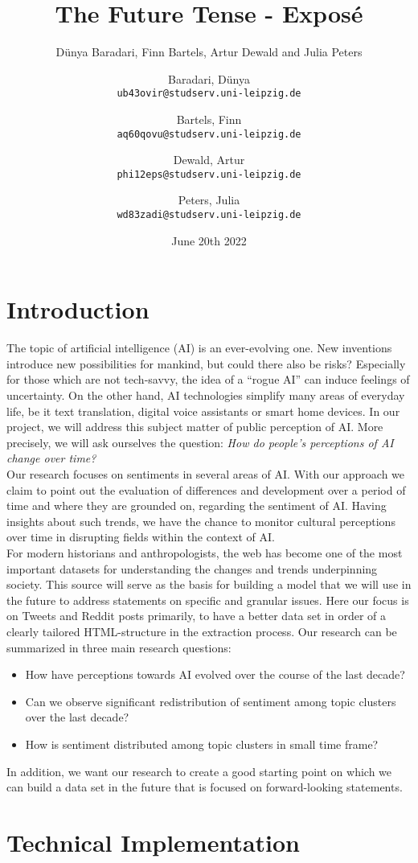 \documentclass[11pt]{article}
\author{
  Dünya Baradari, Finn Bartels, Artur Dewald and Julia Peters
}
\author{
      Baradari, Dünya\\
      \texttt{ub43ovir@studserv.uni-leipzig.de}
      \and
      Bartels, Finn\\
      \texttt{aq60qovu@studserv.uni-leipzig.de}
      \and
      Dewald, Artur\\
      \texttt{phi12eps@studserv.uni-leipzig.de}
      \and
      Peters, Julia\\
      \texttt{wd83zadi@studserv.uni-leipzig.de}
    }
\title{The Future Tense - Exposé}
\date{June 20th 2022}
\begin{document}
\section{Introduction}

The topic of artificial intelligence (AI) is an ever-evolving one. New inventions introduce new possibilities for mankind, but could there also be risks? Especially for those which are not tech-savvy, the idea of a “rogue AI” can induce feelings of uncertainty. On the other hand, AI technologies simplify many areas of everyday life, be it text translation, digital voice assistants or smart home devices. In our project, we will address this subject matter of public perception of AI. More precisely, we will ask ourselves the question: \textit{How do people’s perceptions of AI change over time?} \\ Our research focuses on sentiments in several areas of AI. With our approach we claim to point out the evaluation of differences and development over a period of time and where they are grounded on, regarding the sentiment of AI. Having insights about such trends, we have the chance to monitor cultural perceptions over time in disrupting fields within the context of AI. \\For modern historians and anthropologists, the web has become one of the most important datasets for understanding the changes and trends underpinning society. This source will serve as the basis for building a model that we will use in the future to address statements on specific and granular issues. Here our focus is on Tweets and Reddit posts primarily, to have a better data set in order of a clearly tailored HTML-structure in the extraction process. Our research can be summarized in three main research questions:

\begin{itemize}
\item How have perceptions towards AI evolved over the course of the last decade?
\item Can we observe significant redistribution of sentiment among topic clusters over the last decade?
\item How is sentiment distributed among topic clusters in small time frame?
\end{itemize}

In addition, we want our research to create a good starting point on which we can build a data set in the future that is focused on forward-looking statements.

\section{Technical Implementation}
\end{document}
